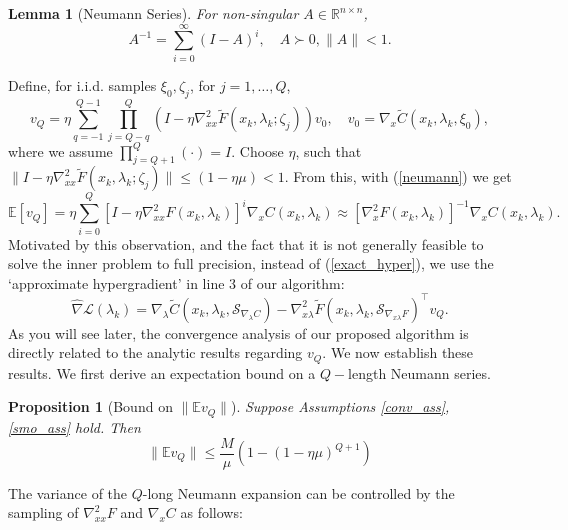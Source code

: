 \documentclass[11pt, twoside]{report}
\newtheorem{proposition}[theorem]{Proposition}
\newtheorem{lemma}[theorem]{Lemma}
\begin{document}
\begin{lemma}[Neumann Series] \label{neumannlem}
For non-singular $A \in \mathbb{R}^{n \times n}$,
\begin{equation} \label{neumann} 
    A^{-1} = \sum^{\infty}_{i=0} (I-A)^i, \quad A \succ 0, \|A\| < 1.
\end{equation}
\end{lemma}
Define, for i.i.d. samples $\xi_0, \zeta_j$, for $j=1,\hdots,Q$,
\begin{equation} \label{HIA_stocBio}
    v_Q= \eta \sum_{q=-1}^{Q-1} \prod_{j=Q-q}^Q\left(I- \eta \nabla_{xx}^2 \tilde{F}\left(x_k, \lambda_k ; \zeta_j\right)\right) v_0, \quad v_0 = \nabla_x \tilde{C}(x_k,\lambda_k,\xi_0),
\end{equation}
where we assume $\prod_{j=Q+1}^Q (\cdot) = I$. Choose $\eta$, such that $\|I- \eta \nabla_{xx}^2 \tilde{F}\left(x_k, \lambda_k ; \zeta_j\right)\| \leq (1-\eta\mu) < 1$. From this, with (\ref{neumann}) we get
\[\mathbb{E}[v_Q] = \eta \sum_{i=0}^{Q} \left[I - \eta\nabla_{xx}^2 F \left(x_k, \lambda_k\right)\right]^i\nabla_x C(x_k,\lambda_k) \approx \left[\nabla_x^2 F\left(x_k, \lambda_k\right)\right]^{-1} \nabla_x C\left(x_k, \lambda_k\right).\]
Motivated by this observation, and the fact that it is not generally feasible to solve the inner problem to full precision, instead of (\ref{exact_hyper}), we use the `approximate hypergradient' in line 3 of our algorithm:
\begin{equation} \label{hat_nabla_def}
                \widehat{\nabla}\mathcal{L}(\lambda_k) = \nabla_\lambda \tilde{C}(x_k,\lambda_k,\mathcal{S}_{\nabla_\lambda C}) - \nabla_{x \lambda}^2 \tilde{F}(x_k,\lambda_k,\mathcal{S}_{\nabla_{x\lambda} F})^\top v_Q.
            \end{equation}
As you will see later, the convergence analysis of our proposed algorithm is directly related to the analytic results regarding $v_Q$. We now establish these results. We first derive an expectation bound on a $Q-$length Neumann series.
\begin{proposition}[Bound on $\|\mathbb{E}v_Q\|$] \label{evq_bnd}
    Suppose Assumptions \ref{conv_ass}, \ref{smo_ass} hold. Then 
    \[\|\mathbb{E}v_Q\| \leq \frac{M}{\mu}(1-(1-\eta\mu)^{Q+1})\]
\end{proposition}
The variance of the $Q$-long Neumann expansion can be controlled by the sampling of $\nabla_{xx}^2 F$ and $\nabla_x C$ as follows:
\end{document}
